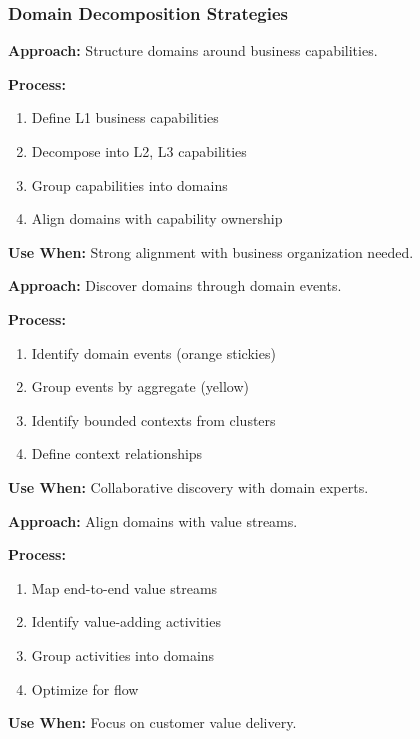 \documentclass[11pt,letterpaper]{article}
\begin{document}
\subsubsection{Domain Decomposition Strategies}

\begin{patternbox}
\textbf{Approach:} Structure domains around business capabilities.

\textbf{Process:}
\begin{enumerate}[nosep]
    \item Define L1 business capabilities
    \item Decompose into L2, L3 capabilities
    \item Group capabilities into domains
    \item Align domains with capability ownership
\end{enumerate}

\textbf{Use When:} Strong alignment with business organization needed.
\end{patternbox}

\begin{patternbox}
\textbf{Approach:} Discover domains through domain events.

\textbf{Process:}
\begin{enumerate}[nosep]
    \item Identify domain events (orange stickies)
    \item Group events by aggregate (yellow)
    \item Identify bounded contexts from clusters
    \item Define context relationships
\end{enumerate}

\textbf{Use When:} Collaborative discovery with domain experts.
\end{patternbox}

\begin{patternbox}
\textbf{Approach:} Align domains with value streams.

\textbf{Process:}
\begin{enumerate}[nosep]
    \item Map end-to-end value streams
    \item Identify value-adding activities
    \item Group activities into domains
    \item Optimize for flow
\end{enumerate}

\textbf{Use When:} Focus on customer value delivery.
\end{patternbox}
\end{document}
